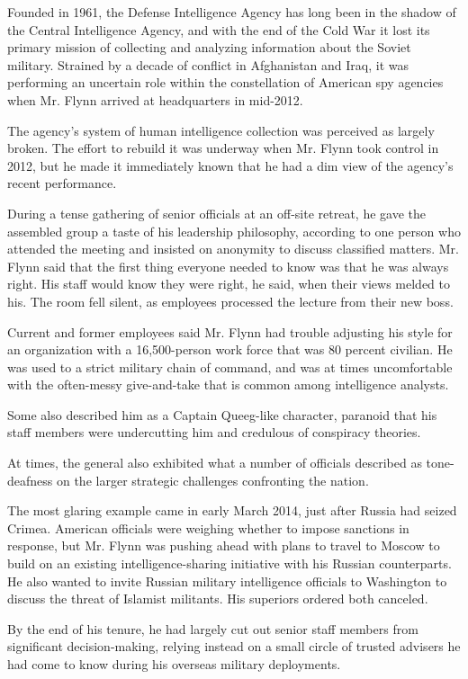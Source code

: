 Founded in 1961, the Defense Intelligence Agency has long been in the
shadow of the Central Intelligence Agency, and with the end of the Cold
War it lost its primary mission of collecting and analyzing information
about the Soviet military. Strained by a decade of conflict in
Afghanistan and Iraq, it was performing an uncertain role within the
constellation of American spy agencies when Mr. Flynn arrived at
headquarters in mid-2012.

The agency's system of human intelligence collection was perceived as
largely broken. The effort to rebuild it was underway when Mr. Flynn
took control in 2012, but he made it immediately known that he had a dim
view of the agency's recent performance.

During a tense gathering of senior officials at an off-site retreat, he
gave the assembled group a taste of his leadership philosophy, according
to one person who attended the meeting and insisted on anonymity to
discuss classified matters. Mr. Flynn said that the first thing everyone
needed to know was that he was always right. His staff would know they
were right, he said, when their views melded to his. The room fell
silent, as employees processed the lecture from their new boss.

Current and former employees said Mr. Flynn had trouble adjusting his
style for an organization with a 16,500-person work force that was 80
percent civilian. He was used to a strict military chain of command, and
was at times uncomfortable with the often-messy give-and-take that is
common among intelligence analysts.

Some also described him as a Captain Queeg-like character, paranoid that
his staff members were undercutting him and credulous of conspiracy
theories.

At times, the general also exhibited what a number of officials
described as tone-deafness on the larger strategic challenges
confronting the nation.

The most glaring example came in early March 2014, just after Russia had
seized Crimea. American officials were weighing whether to impose
sanctions in response, but Mr. Flynn was pushing ahead with plans to
travel to Moscow to build on an existing intelligence-sharing initiative
with his Russian counterparts. He also wanted to invite Russian military
intelligence officials to Washington to discuss the threat of Islamist
militants. His superiors ordered both canceled.

By the end of his tenure, he had largely cut out senior staff members
from significant decision-making, relying instead on a small circle of
trusted advisers he had come to know during his overseas military
deployments.


